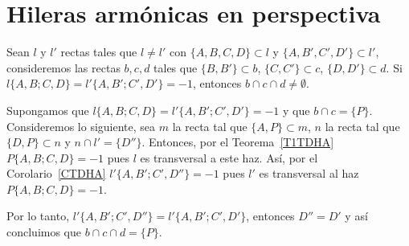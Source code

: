 \section{Hileras armónicas en perspectiva}
\begin{teo}
Sean $l$ y $l'$ rectas tales que $l\neq l'$ con $\{A,B,C,D\}\subset l$ y $\{A,B',C',D'\}\subset l'$, consideremos las rectas $b,c,d$ tales que $\{B,B'\}\subset b$, $\{C,C'\}\subset c$, $\{D,D'\}\subset d$. Si $l\{A,B;C,D\}=l'\{A,B';C',D'\}=-1$, entonces $b\cap c\cap d\neq\emptyset$.
\end{teo}
\begin{dem}
Supongamos que $l\{A,B;C,D\}=l'\{A,B';C',D'\}=-1$ y que $b\cap c=\{P\}$. 
Consideremos lo siguiente, sea $m$ la recta tal que $\{A,P\}\subset m$, $n$ la recta tal que $\{D,P\}\subset n$ y $n\cap l'=\{D''\}$. Entonces, por el Teorema~\ref{T1TDHA} $P\{A,B;C,D\}=-1$ pues $l$ es transversal a este haz. Así, por el Corolario~\ref{CTDHA} $l'\{A,B';C',D''\}=-1$ pues $l'$ es transversal al haz $P\{A,B;C,D\}=-1$. 

Por lo tanto, $l'\{A,B';C',D''\}=l'\{A,B';C',D'\}$, entonces $D''=D'$ y así concluimos que $b\cap c\cap d=\{P\}$.
\end{dem}
